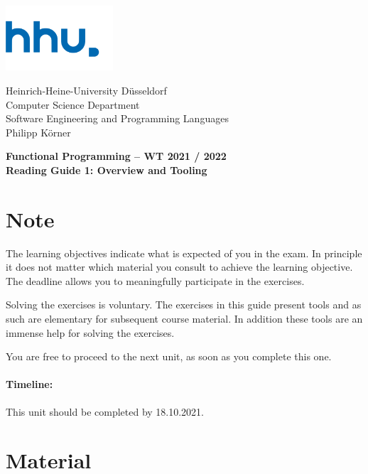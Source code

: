 \documentclass[11pt,a4paper]{article}
\begin{document}
	
\begin{minipage}[b]{\textwidth}
		\parbox[t]{5cm}{%
			\includegraphics[width=4cm]{unilogo}
			\hfill
		}
		\parbox[b]{11cm}{%
			Heinrich-Heine-University D\"usseldorf\\
			Computer Science Department\\
			Software Engineering and Programming Languages\\
		Philipp K\"orner
}
		
\end{minipage}
	\begin{center}
		\bf
		Functional Programming -- WT 2021 / 2022\\
		Reading Guide 1: Overview and Tooling
	\end{center}
	
	\pagestyle{empty}
	
	\section*{Note}
	The learning objectives indicate what is expected of you in the exam.
	In principle it does not matter which material you consult to achieve the learning objective.
	The deadline allows you to meaningfully participate in the exercises.
	
	Solving the exercises is voluntary.
	The exercises in this guide present tools and as such are elementary for subsequent course material.
	In addition these tools are an immense help for solving the exercises.
	
	You are free to proceed to the next unit, as soon as you complete this one.  
	
	\paragraph{Timeline:} This unit should be completed by 18.10.2021.
	
	\section{Material} 
	
\end{document}

